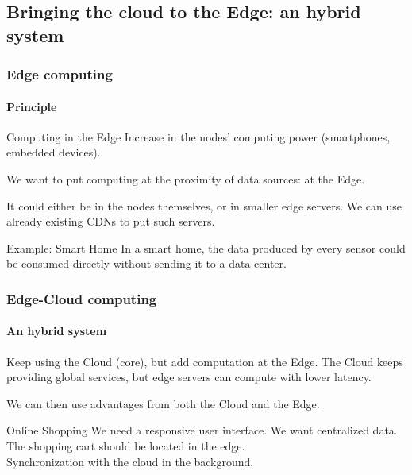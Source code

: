 \documentclass[utf8,xcolor=table, page number]{earlywinter}
\begin{document}
\subsection{Bringing the cloud to the Edge: an hybrid system} %
\begin{frame}
  \frametitle{Edge computing}
  \framesubtitle{Principle}

  \begin{block}{Computing in the Edge}
    Increase in the nodes' computing power (smartphones, embedded devices).
  \end{block}
  \vfill
   We want to put computing at the proximity of data sources: at the Edge.

   It could either be in the nodes themselves, or in smaller edge servers. We can use already existing CDNs to put such servers.
  \vfill
   \begin{exampleblock}{Example: Smart Home}
     In a smart home, the data produced by every sensor could be consumed directly without sending it to a data center.
   \end{exampleblock}

\end{frame}

\begin{frame}
  \frametitle{Edge-Cloud computing}
  \framesubtitle{An hybrid system}

%
  Keep using the Cloud (core), but add computation at the Edge.
  The Cloud keeps providing global services, but edge servers can compute with lower latency.

  We can then use advantages from both the Cloud and the Edge.
  \vfill
  \begin{exampleblock}{Online Shopping}
    We need a responsive user interface. We want centralized data.\\
    The shopping cart should be located in the edge.\\
    Synchronization with the cloud in the background.
  \end{exampleblock}
  
\end{frame}
\end{document}
